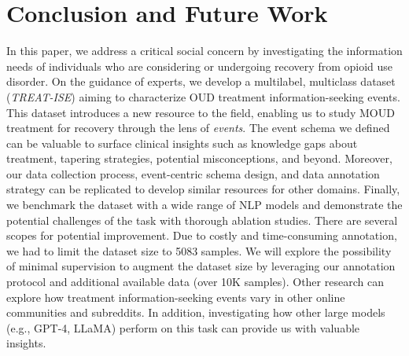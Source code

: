 \documentclass[letterpaper]{article}
\begin{document}
\vspace{-0.82mm}
\vspace{-1.99mm}
\vspace{-2.27mm}
\section{Conclusion and Future Work}
In this paper, we address a critical social concern by investigating the information needs of individuals who are considering or undergoing recovery from opioid use disorder. On the guidance of experts, we develop a multilabel, multiclass dataset (\textit{TREAT-ISE}) aiming to characterize OUD treatment information-seeking events. This dataset introduces a new resource to the field, enabling us to study MOUD treatment for recovery through the lens of \textit{events}. The event schema we defined can be valuable to surface clinical insights such as knowledge gaps about treatment, tapering strategies, potential misconceptions, and beyond. Moreover, our data collection process, event-centric schema design, and data annotation strategy can be replicated to develop similar resources for other domains. Finally, we benchmark the dataset with a wide range of NLP models and demonstrate the potential challenges of the task with thorough ablation studies.  There are several scopes for potential improvement.
Due to costly and time-consuming annotation, we had to limit the dataset size to 5083 samples. We will explore the possibility of minimal supervision to augment the dataset size by leveraging our annotation protocol and additional available data (over 10K samples). Other research can explore how treatment information-seeking events vary in other online communities and subreddits. In addition, investigating how other large models (e.g., GPT-4, LLaMA) perform on this task can provide us with valuable insights.

\vspace{-0.89mm}
\vspace{-1.51mm}
\end{document}
